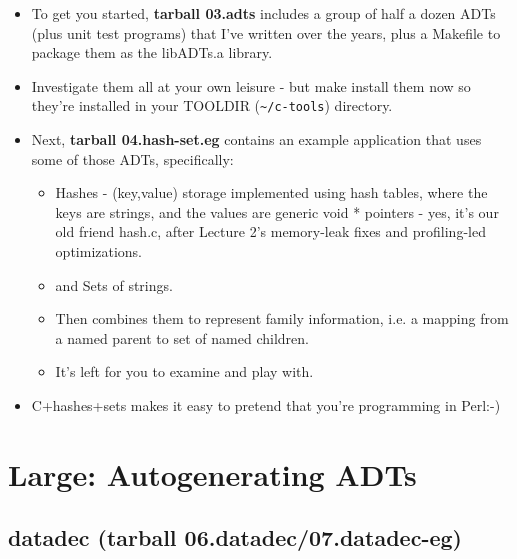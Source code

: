 \documentclass[aspectratio=169]{beamer}
\newcommand{\pitem}{\pause \item}
\begin{document}
\begin{frame}[fragile]
    \begin{itemize}
    \item
     To get you started, {\bf tarball 03.adts} includes a group
     of half a dozen ADTs (plus unit test programs) that I've written over
     the years,
     plus a Makefile to package them as the \alert{libADTs.a} library.

    \pitem
      Investigate them all at your own leisure - but \alert{make install}
      them now so
      they're installed in your TOOLDIR (\verb+~/c-tools+) directory.

    \pitem
      Next, {\bf tarball 04.hash-set.eg} contains an example application
      that uses some of those ADTs, specifically:

      \begin{itemize}
      \pitem
        \alert{Hashes} - \alert{(key,value)} storage implemented using hash
	tables, where the keys are strings, and the values are generic
	\alert{void *} pointers - yes, it's our old friend hash.c, after
	Lecture 2's memory-leak fixes and profiling-led optimizations.

      \pitem
        and \alert{Sets of strings}.

      \pitem
        Then combines them to represent family information, i.e.
        a mapping from a \alert{named parent} to \alert{set of named children}.

      \item
        It's left for you to examine and play with.

      \end{itemize}
      
      \pitem
        \alert{C+hashes+sets} makes it easy to pretend that you're programming
	in Perl:-)
    \end{itemize}
\end{frame}

\section{Large: Autogenerating ADTs}
\subsection{datadec (tarball 06.datadec/07.datadec-eg)}
\end{document}
